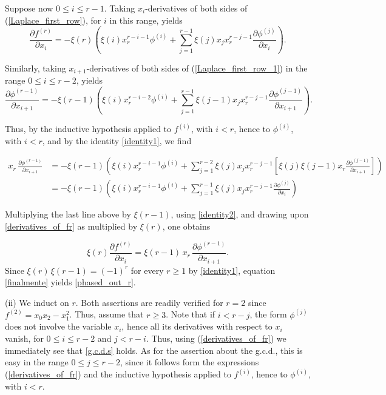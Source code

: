 \documentclass[11pt]{article}   %
\theoremstyle{definition}
\numberwithin{Theorem}{section} \numberwithin{equation}{section}
\begin{document}
{Suppose now $0\leq i\leq r-1$. Taking $x_i$-derivatives of both
sides of (\ref{Laplace_first_row}), for $i$ in this range, yields
\begin{equation}\label{derivatives_of_fr}
\frac{\partial f^{(r)}}{\partial
x_i}=-\xi(r)\left(\xi(i)x_r^{r-i-1}\phi^{(i)}+\sum_{j=1}^{r-1}\xi(j)
x_j x_r^{r-j-1}\frac{\partial \phi^{(j)}}{\partial x_i}\right).
\end{equation}

Similarly, taking $x_{i+1}$-derivatives of both sides of
(\ref{Laplace_first_row_1}) in the range $0\leq i\leq r-2$, yields
\begin{equation}\label{derivatives_of_fr_1}
\frac{\partial \phi^{(r-1)}}{\partial
x_{i+1}}=-\xi(r-1)\left(\xi(i)x_r^{r-i-2}\phi^{(i)}+
\sum_{j=1}^{r-1}\xi(j-1) x_j x_r^{r-j-1}\frac{\partial
\phi^{(j-1)}}{\partial x_{i+1}}\right).
\end{equation}

Thus, by the inductive hypothesis applied to $f^ {(i)}$, with
$i<r$, hence to $\phi^ {(i)}$, with $i<r$, and by the identity
\eqref{identity1}, we find

\begin{align*}
x_r\,\frac{\partial \phi ^{(r-1)}}{\partial
x_{i+1}}&=-\xi(r-1)\left(\xi(i)x_r^{r-i-1}\phi^{(i)}+
\sum_{j=1}^{r-2}\xi(j) x_j
 x_r^{r-j-1}\left[\xi(j)\xi(j-1)x_r\frac{\partial \phi^{(j-1)}}{\partial x_{i+1}}
\right]\right)\\
&=-\xi(r-1)\left(\xi(i)x_r^{r-i-1}\phi^{(i)}+\sum_{j=1}^{r-1}\xi(j) x_j
x_r^{r-j-1} \frac{\partial \phi^{(j)}}{\partial x_{i}}\right)
\end{align*}

Multiplying the last line above by $\xi(r-1)$, using
\eqref{identity2}, and drawing upon \eqref{derivatives_of_fr} as
multiplied by $\xi(r)$, one obtains

\begin{equation}\label{finalmente}
\xi(r)\frac{\partial f^{(r)}}{\partial x_i}=\xi(r-1)\, x_r\, \frac{\partial
\phi^{(r-1)}}{\partial x_{i+1}}.
\end{equation}
 Since $\xi(r)\,\xi(r-1)=(-1)^r$ for every $r\geq 1$ by
\eqref{identity1}, equation \eqref{finalmente}  yields
\eqref{phased_out_r}.
\medskip

(ii) We induct on $r$. Both assertions are readily verified for
$r=2$ since $f^{(2)}=x_0x_2-x_1^2$. Thus, assume that $r\geq 3$.
Note that if $i<r-j$, the form $\phi^{(j)}$ does not involve the
variable $x_i$, hence all its derivatives with respect to $x_i$
vanish, for $0\leq i\leq r-2$ and $j<r-i$. Thus, using
(\ref{derivatives_of_fr}) we immediately see that \eqref {g.c.d.s}
holds. As for the assertion about the g.c.d., this is easy in the
range $0\leq j\leq r-2$, since it follows form the expressions
(\ref{derivatives_of_fr}) and the inductive hypothesis applied to
$f^ {(i)}$, hence to $\phi^ {(i)}$, with $i<r$.

}
\end{document}
